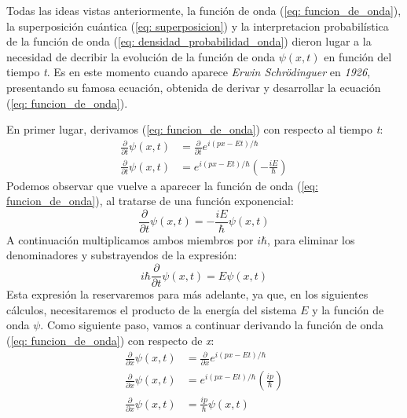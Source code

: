 \documentclass[12pt]{article}
\numberwithin{equation}{section} %
\begin{document}
    \vspace{5mm}

    Todas las ideas vistas anteriormente, la función de onda (\ref{eq: funcion_de_onda}), la superposición cuántica (\ref{eq: superposicion}) y la interpretacion probabilística de la función de onda (\ref{eq: densidad_probabilidad_onda}) dieron lugar a la necesidad de decribir la evolución de la función de onda \( \psi(x, t) \) en función del tiempo \textit{t}. Es en este momento cuando aparece \textit{Erwin Schrödinguer} en \textit{1926}, presentando su famosa ecuación, obtenida de derivar y desarrollar la ecuación  (\ref{eq: funcion_de_onda}). 
    
    En primer lugar, derivamos (\ref{eq: funcion_de_onda}) con respecto al tiempo \textit{t}:
    \begin{align*}
        \frac{\partial}{\partial t} \psi(x, t) &= \frac{\partial}{\partial t} e^{i(px - Et) / \hbar} \\[8pt]
        \frac{\partial}{\partial t} \psi(x, t) &= e^{i(px - Et) / \hbar} \left(- \frac{iE}{\hbar} \right)
    \end{align*}
    Podemos observar que vuelve a aparecer la función de onda (\ref{eq: funcion_de_onda}), al tratarse de una función exponencial:
    \begin{equation*}
        \frac{\partial}{\partial t} \psi(x, t) = - \frac{iE}{\hbar} \psi(x, t)
    \end{equation*}
    A continuación multiplicamos ambos miembros por \( i\hbar \), para eliminar los denominadores y substrayendos de la expresión:
    \begin{equation}
        i \hbar \frac{\partial}{\partial t} \psi(x, t) = E \psi(x, t)
        \label{eq: obtencion_schrodinguer}
    \end{equation}
    Esta expresión la reservaremos para más adelante, ya que, en los siguientes cálculos, necesitaremos el producto de la energía del sistema \( E \) y la función de onda \( \psi \). Como siguiente paso, vamos a continuar derivando la función de onda (\ref{eq: funcion_de_onda}) con respecto de \textit{x}:
    \begin{align*}
        \frac{\partial}{\partial x} \psi(x, t) &= \frac{\partial}{\partial x} e^{i(px - Et) / \hbar} \\[10pt]
        \frac{\partial}{\partial x} \psi(x, t) &= e^{i(px - Et) / \hbar} \left( \frac{ip}{\hbar} \right) \\[10pt]
        \frac{\partial}{\partial x} \psi(x, t) &= \frac{ip}{\hbar} \psi(x, t)
    \end{align*}
\end{document}
